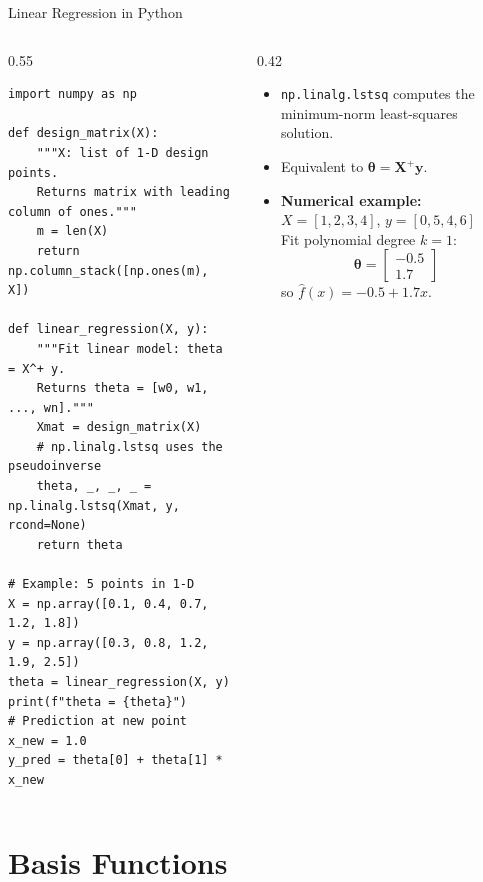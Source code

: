 \documentclass[aspectratio=169,10pt]{beamer}
\newcommand{\vy}{\mathbf{y}}
\newcommand{\btheta}{\boldsymbol{\theta}}
\newcommand{\bX}{\mathbf{X}}
\newcommand{\hatf}{\hat{f}}
\begin{document}
\begin{frame}[fragile]{Linear Regression in Python}
  \begin{columns}[T]
    \begin{column}{0.55\textwidth}
\begin{lstlisting}[style=python, caption={Design matrix and linear regression (Python/NumPy)}]
import numpy as np

def design_matrix(X):
    """X: list of 1-D design points.
    Returns matrix with leading column of ones."""
    m = len(X)
    return np.column_stack([np.ones(m), X])

def linear_regression(X, y):
    """Fit linear model: theta = X^+ y.
    Returns theta = [w0, w1, ..., wn]."""
    Xmat = design_matrix(X)
    # np.linalg.lstsq uses the pseudoinverse
    theta, _, _, _ = np.linalg.lstsq(Xmat, y, rcond=None)
    return theta

# Example: 5 points in 1-D
X = np.array([0.1, 0.4, 0.7, 1.2, 1.8])
y = np.array([0.3, 0.8, 1.2, 1.9, 2.5])
theta = linear_regression(X, y)
print(f"theta = {theta}")
# Prediction at new point
x_new = 1.0
y_pred = theta[0] + theta[1] * x_new
\end{lstlisting}
    \end{column}
    \begin{column}{0.42\textwidth}
      \begin{itemize}
        \item \texttt{np.linalg.lstsq} computes the minimum-norm
              least-squares solution.
        \item Equivalent to $\btheta = \bX^+ \vy$.
        \item \textbf{Numerical example:}\\[3pt]
              $X = [1, 2, 3, 4]$,\; $y = [0, 5, 4, 6]$\\
              Fit polynomial degree $k=1$:
              \[
                \btheta = \begin{bmatrix}-0.5\\1.7\end{bmatrix}
              \]
              so $\hatf(x) = -0.5 + 1.7x$.
      \end{itemize}
    \end{column}
  \end{columns}
\end{frame}

\section{Basis Functions}
\end{document}
